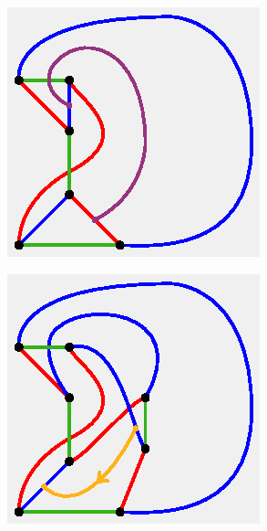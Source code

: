 \documentclass[11pt, oneside]{amsart}
\theoremstyle{theorem}
\theoremstyle{definition}
\theoremstyle{theorem}
\begin{document}
\begin{figure}[h!]
\begin{subfigure}{.24\textwidth}
\end{subfigure}
\begin{subfigure}{.25\textwidth}
  \centering
  \includegraphics[width=.9\linewidth]{nonbt5.eps}
    \label{nxb5}
\end{subfigure}%
\begin{subfigure}{.25\textwidth}
  \centering
  \includegraphics[width=.9\linewidth]{nonbt6.eps}
  \label{nxb6}
\end{subfigure}

\end{figure}
\end{document}
